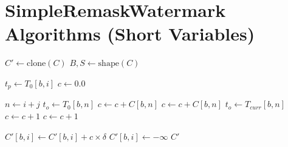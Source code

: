 \documentclass{article}
\begin{document}
\section*{SimpleRemaskWatermark Algorithms (Short Variables)}
\begin{algorithm}
\caption{\texttt{apply\_watermark}}
\label{alg:apply_watermark}
\begin{algorithmic}[1]
    \State $C' \gets \text{clone}(C)$
    \State $B, S \gets \text{shape}(C)$ 
    
            \State $t_p \gets T_0[b, i]$ 
            \State $c \gets 0.0$ 
            
                \State $n \gets i + j$
                     
                        \State $t_o \gets T_0[b, n]$ 
                                \State $c \gets c + C[b, n]$
                            \EndIf
                        \Else
                                \State $c \gets c + C[b, n]$
                            \EndIf
                        \EndIf
                    \Else {}
                        \State $t_o \gets T_{curr}[b, n]$
                                \State $c \gets c + 1$
                            \EndIf
                        \Else
                                \State $c \gets c + 1$
                            \EndIf
                        \EndIf
                    \EndIf
                \EndIf
            \EndFor
            
                \State $C'[b, i] \gets C'[b, i] + c \times \delta$
            \Else
                \State $C'[b, i] \gets -\infty$
            \EndIf
        \EndFor
    \EndFor
    \State \Return $C'$
\EndProcedure
\end{algorithmic}
\end{algorithm}
\end{document}
